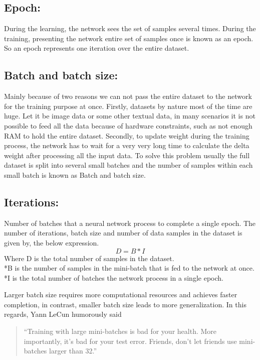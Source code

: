 \subsection{Epoch:}
During the learning, the network sees the set of samples several times. During the training, presenting the network entire set of samples once is known as an epoch. So an epoch represents one iteration over the entire dataset.
\subsection{Batch and batch size:}
Mainly because of two reasons we can not pass the entire dataset to the network for the training purpose at once. Firstly, datasets by nature most of the time are huge. Let it be image data or some other textual data, in many scenarios it is not possible to feed all the data because of hardware constraints, such as not enough RAM to hold the entire dataset.
Secondly, to update weight during the training process, the network has to wait for a very very long time to calculate the delta weight after processing all the input data. To solve this problem usually the full dataset is split into several small batches and the number of samples within each small batch is known as 
Batch and batch size.

\subsection{Iterations:} 
Number of batches that a neural network process to complete a single epoch.
The number of  iterations, batch size and  number of data samples in the dataset is given by, the below expression.
\begin{equation}
    D = B * I
\end{equation}
Where D is the total number of samples in the dataset.
\\*B is the number of samples in the mini-batch that is fed to the network at once.
\\*I is the  total number of batches the network process in a single epoch.

Larger batch size requires more computational resources and achieves faster completion, in contrast, smaller batch size leads to more generalization. In this regards, Yann  LeCun humorously said
\begin{quote}
``Training with large mini-batches is bad for your health. More importantly, it's bad for your test error.  Friends, don't let friends use mini-batches larger than 32.''
\end{quote}   

